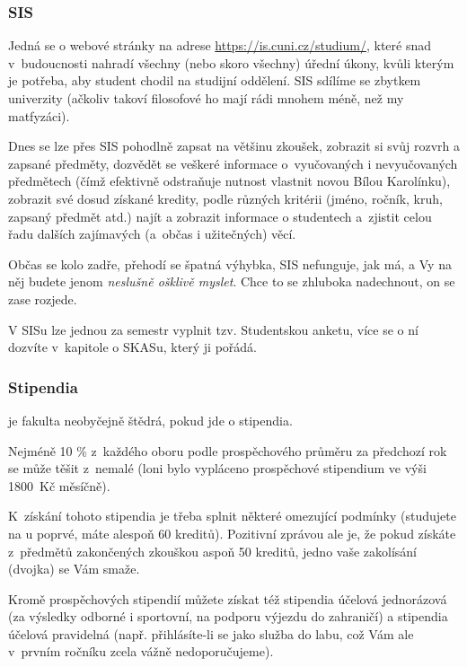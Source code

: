 \subsubsection{SIS}

Jedná se o webové stránky na adrese \url{https://is.cuni.cz/studium/}, které snad v~budoucnosti nahradí
všechny (nebo skoro všechny) úřední úkony, kvůli kterým je
potřeba, aby student chodil na studijní oddělení. SIS sdílíme se zbytkem univerzity (ačkoliv takoví filosofové ho mají rádi mnohem méně, než my matfyzáci).

Dnes se lze přes SIS pohodlně zapsat na většinu zkoušek, zobrazit
si svůj rozvrh a zapsané předměty, dozvědět se veškeré informace
o~vyučovaných i nevyučovaných předmětech (čímž efektivně odstraňuje
nutnost vlastnit novou Bílou Karolínku), zobrazit své dosud
získané kredity, podle různých kritérii (jméno, ročník, kruh,
zapsaný předmět atd.) najít a zobrazit informace o studentech
a~zjistit celou řadu dalších zajímavých (a~občas i užitečných) věcí.

Občas se kolo zadře, přehodí se špatná výhybka, SIS nefunguje, jak má, a Vy na něj budete jenom {\it neslušně ošklivě myslet}. Chce to se zhluboka nadechnout, on se zase rozjede.

V SISu lze jednou za semestr vyplnit tzv. Studentskou anketu, více se o ní dozvíte v~kapitole o SKASu, který ji pořádá.

\subsubsection{Stipendia}
\Mfz{} je fakulta neobyčejně štědrá, pokud jde o stipendia.

Nejméně
10 \% z~každého oboru podle prospěchového průměru za předchozí rok
se může těšit z~nemalé  (loni bylo vypláceno
prospěchové stipendium ve výši 1800~Kč měsíčně). 

K~získání tohoto
stipendia je třeba splnit některé omezující podmínky (studujete na
\mfz{}u poprvé, máte alespoň 60 kreditů). Pozitivní zprávou ale je,
že pokud získáte z~předmětů zakončených zkouškou aspoň 50 kreditů,
jedno vaše zakolísání (dvojka) se Vám smaže.

Kromě prospěchových stipendií můžete získat též stipendia účelová
jednorázová (za výsledky odborné i sportovní, na podporu výjezdu
do zahraničí) a stipendia účelová pravidelná (např. přihlásíte-li
se jako služba do labu, což Vám ale v~prvním ročníku zcela vážně
nedoporučujeme). 


